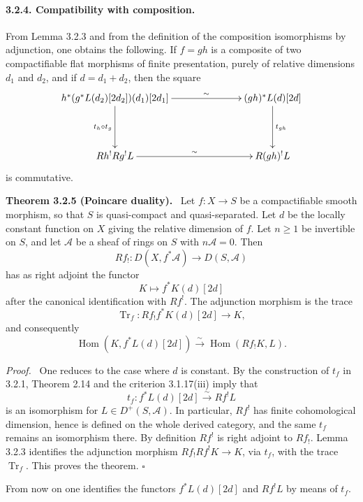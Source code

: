 \documentclass[12pt]{article}
\newcommand{\Aa}{\mathcal A}
\DeclareMathOperator{\Hom}{Hom}
\DeclareMathOperator{\Tr}{Tr}
\newcommand{\qedtext}{\hfill\(\square\)}
\newenvironment{statement}[1]{\par\medskip\noindent\textbf{#1.}\ }{\par\medskip}
\newenvironment{prooftext}[1][Proof]{\par\noindent\emph{#1.}\ }{\par\medskip}
\begin{document}
\paragraph{3.2.4. Compatibility with composition.}
From Lemma 3.2.3 and from the definition of the composition isomorphisms by adjunction, one obtains the following. If $f=gh$ is a composite of two compactifiable flat morphisms of finite presentation, purely of relative dimensions $d_1$ and $d_2$, and if $d=d_1+d_2$, then the square
\[
\xymatrix@C=2.5cm@R=1.5cm{
h^*(g^*L(d_2)[2d_2])(d_1)[2d_1]\ar[r]^-{\sim}\ar[d]_{t_h\circ t_g}&
(gh)^*L(d)[2d]\ar[d]^{t_{gh}}\\
Rh^!Rg^!L\ar[r]^-{\sim}&R(gh)^!L
}
\]
is commutative.

\begin{statement}{Theorem 3.2.5 (Poincare duality)}
Let $f:X\to S$ be a compactifiable smooth morphism, so that $S$ is quasi-compact and quasi-separated. Let $d$ be the locally constant function on $X$ giving the relative dimension of $f$. Let $n\geq 1$ be invertible on $S$, and let $\Aa$ be a sheaf of rings on $S$ with $n\Aa=0$. Then
\[
   Rf_!:D(X,f^*\Aa)\longrightarrow D(S,\Aa)
\]
has as right adjoint the functor
\[
   K\longmapsto f^*K(d)[2d]
\]
after the canonical identification with $Rf^!$. The adjunction morphism is the trace
\[
   \Tr_f:Rf_!f^*K(d)[2d]\longrightarrow K,
\]
and consequently
\[
   \Hom(K,f^*L(d)[2d])\xrightarrow{\sim}\Hom(Rf_!K,L).
\]
\end{statement}

\begin{prooftext}
One reduces to the case where $d$ is constant. By the construction of $t_f$ in 3.2.1, Theorem 2.14 and the criterion 3.1.17(iii) imply that
\[
   t_f:f^*L(d)[2d]\xrightarrow{\sim}Rf^!L
\]
is an isomorphism for $L\in D^+(S,\Aa)$. In particular, $Rf^!$ has finite cohomological dimension, hence is defined on the whole derived category, and the same $t_f$ remains an isomorphism there. By definition $Rf^!$ is right adjoint to $Rf_!$. Lemma 3.2.3 identifies the adjunction morphism $Rf_!Rf^!K\to K$, via $t_f$, with the trace $\Tr_f$. This proves the theorem. \qedtext
\end{prooftext}

From now on one identifies the functors $f^*L(d)[2d]$ and $Rf^!L$ by means of $t_f$.
\end{document}
